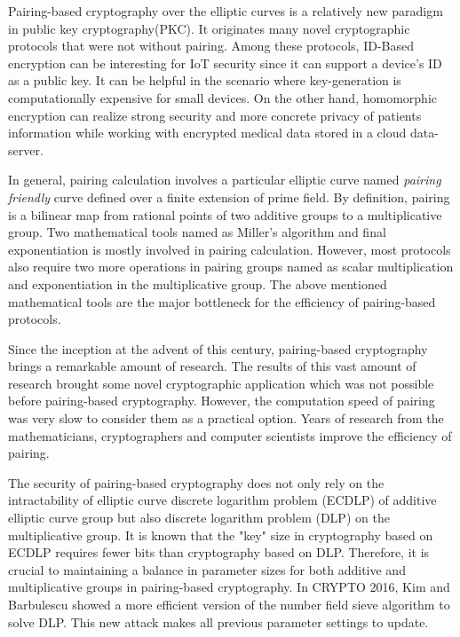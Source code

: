 Pairing-based cryptography over the elliptic curves is a relatively new paradigm in public key cryptography(PKC). 
It originates many novel cryptographic protocols that were not without pairing. Among these protocols, ID-Based encryption can be interesting for IoT security since it can support a device's ID as a public key.
It can be helpful in the scenario where key-generation is computationally expensive for small devices.
On the other hand, homomorphic encryption can realize strong security and more concrete privacy of patients information while working with encrypted medical data stored in a cloud data-server.

In general, pairing calculation involves a particular elliptic curve named \textit{pairing friendly} curve defined over a finite extension of prime field.
By definition, pairing is a bilinear map from rational points of two additive groups to a multiplicative group.
Two mathematical tools named as Miller's algorithm and final exponentiation is mostly involved in pairing calculation.
However, most protocols also require two more operations in pairing groups named as scalar multiplication and exponentiation in the multiplicative group.
The above mentioned mathematical tools are the major bottleneck for the efficiency of pairing-based protocols.

Since the inception at the advent of this century, pairing-based cryptography brings a remarkable amount of research. 
The results of this vast amount of research brought some novel cryptographic application which was not possible before pairing-based cryptography. 
However, the computation speed of pairing was very slow to consider them as a practical option.
Years of research from the mathematicians, cryptographers and computer scientists improve the efficiency of pairing.

The security of pairing-based cryptography does not only rely on the intractability of elliptic curve discrete logarithm problem (ECDLP) of additive elliptic curve group but also discrete logarithm problem (DLP) on the multiplicative group.
It is known that the "key" size in cryptography based on ECDLP requires fewer bits than cryptography based on DLP.
Therefore, it is crucial to maintaining a balance in parameter sizes for both additive and multiplicative groups in pairing-based cryptography.
In CRYPTO 2016, Kim and Barbulescu showed a more efficient version of the number field sieve algorithm to solve DLP. 
This new attack makes all previous parameter settings to update.

